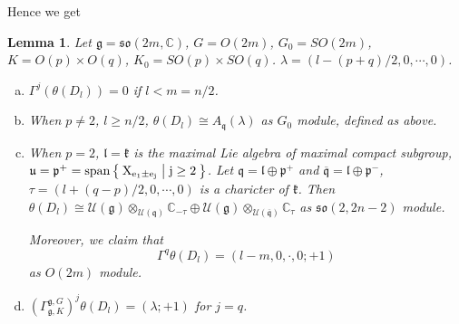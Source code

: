 \documentclass[12pt]{article}
\newtheorem{lemma}{Lemma}
\def\bC{{\mathbb{C}}}
\def\sspan{\rm{span}}
\def\gg{{\mathfrak{g}}}
\def\aso{\mathfrak{so}}
\def\fuu{\mathfrak{u}}
\def\fll{\mathfrak{l}}
\def\fpp{\mathfrak{p}}
\def\fqq{\mathfrak{q}}
\def\fgg{\mathfrak{g}}
\def\fkk{\mathfrak{k}}
\def\cuu{\mathcal{U}}
\begin{document}
Hence we get
\begin{lemma}\label{lemma:derived_D_l}
Let $\fgg = \aso(2m,\bC)$, $G = O(2m)$, $G_0 = SO(2m)$, $K = O(p)\times O(q)$, 
$K_0 = SO(p)\times SO(q)$.  $\lambda = (l-(p+q)/2,0,\cdots, 0)$.
\begin{enumerate}[a)]
\item $\Gamma^j(\theta(D_l)) = 0$ if $l<m=n/2$.  
\item When $p\neq 2$, $l\geq n/2$, $\theta(D_l)\cong A_\fqq(\lambda)$ as $G_0$ module, defined as above.
\item When $p=2$, $\fll=\fkk$ is the maximal Lie algebra of maximal compact
subgroup, $\fuu =\fpp^+=\sspan\Set{X_{e_1\pm e_j}|j\geq 2}$. Let 
$\fqq=\fll\oplus\fpp^+$ and
$\overline{\fqq}=\fll\oplus\fpp^-$, $\tau= (l+(q-p)/2,0,\cdots, 0)$ is a charicter of $\fkk$. Then
$\theta(D_l)\cong \cuu(\gg)\otimes_{\cuu(\fqq)}\bC_{-\tau}\oplus  \cuu(\gg)\otimes_{\cuu(\overline{\fqq})}\bC_{\tau} $ as $\aso(2,2n-2)$ module.

Moreover, we claim that
\[
\Gamma^q\theta(D_l) = (l-m,0,\cdot, 0; +1) 
\]
as $O(2m)$ module. 
\item $\left(\Gamma_{\fgg,K}^{\fgg,G}\right)^j\theta(D_l) = (\lambda; +1)$ for $j = q$.
\end{enumerate}
\end{lemma}
\proof
\end{document}
